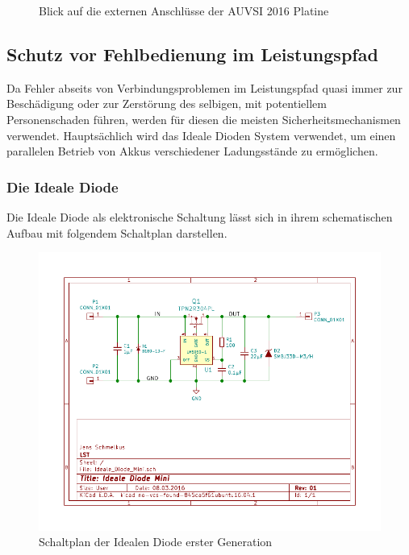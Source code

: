 \begin{figure}[H]
\centering
{}
\caption{Blick auf die externen Anschlüsse der AUVSI 2016 Platine} 
\label{fig:Blick auf die Externen Anschlüsse der AUVSI 2016 Platine}
\end{figure}


\subsection{Schutz vor Fehlbedienung im Leistungspfad}

Da Fehler abseits von Verbindungsproblemen im Leistungspfad quasi immer zur Beschädigung oder zur Zerstörung des selbigen, mit potentiellem Personenschaden führen, werden für diesen die meisten Sicherheitsmechanismen verwendet.
Hauptsächlich wird das Ideale Dioden System verwendet, um einen parallelen Betrieb von Akkus verschiedener Ladungsstände zu ermöglichen.

\subsubsection{Die Ideale Diode} \label{Die Ideale Diode}

Die Ideale Diode als elektronische Schaltung lässt sich in ihrem schematischen Aufbau mit folgendem Schaltplan darstellen.

\begin{figure}[H]
\centering
\includegraphics[width=1.0\textwidth]{Schaltplaene/Ideale_Diode_Mini.pdf} 
\caption{Schaltplan der Idealen Diode erster Generation} 
\label{fig:Schaltplan der Idealen Diode erster Generation}
\end{figure}

